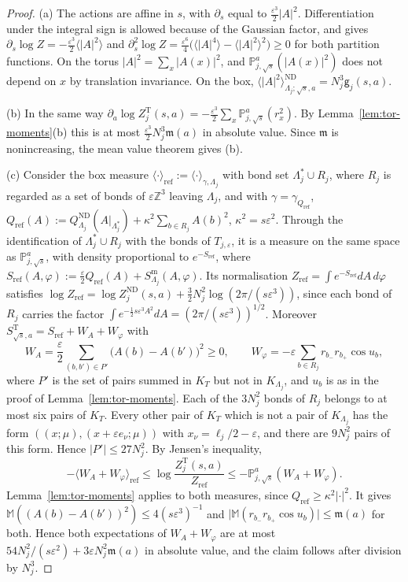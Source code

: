 \documentclass[11pt]{amsart}
\theoremstyle{plain}
\theoremstyle{definition}
\theoremstyle{remark}
\numberwithin{equation}{section}
\newcommand{\Z}{\mathbb{Z}}
\newcommand{\eps}{\varepsilon}
\newcommand{\abs}[1]{\lvert #1\rvert}
\newcommand{\ev}[1]{\langle #1\rangle}
\begin{document}
\begin{proof}
(a) The actions are affine in $s$, with $\partial_s$ equal to $\frac{\eps^3}2\abs A^2$. Differentiation under the integral sign is allowed because of the Gaussian factor, and gives $\partial_s\log Z=-\frac{\eps^3}2\ev{\abs A^2}$ and $\partial_s^2\log Z=\frac{\eps^6}4\big(\ev{\abs A^4}-\ev{\abs A^2}^2\big)\ge0$ for both partition functions. On the torus $\abs A^2=\sum_x\abs{A(x)}^2$, and $\mathbb P^a_{j,\sqrt s}(\abs{A(x)}^2)$ does not depend on $x$ by translation invariance. On the box, $\ev{\abs A^2}^{\mathrm{ND}}_{\Lambda_j;\sqrt s,a}=N_j^3\mathsf g_j(s,a)$.

(b) In the same way $\partial_a\log Z^{\mathrm T}_j(s,a)=-\frac{\eps^3}2\sum_x\mathbb P^a_{j,\sqrt s}(r_x^2)$. By Lemma~\ref{lem:tor-moments}(b) this is at most $\frac{\eps^3}2N_j^3\mathfrak m(a)$ in absolute value. Since $\mathfrak m$ is nonincreasing, the mean value theorem gives (b).

(c) Consider the box measure $\ev\cdot_{\mathrm{ref}}:=\ev\cdot_{\gamma,\Lambda_j}$ with bond set $\Lambda_j^*\cup R_j$, where $R_j$ is regarded as a set of bonds of $\eps\Z^3$ leaving $\Lambda_j$, and with $\gamma=\gamma_{Q_{\mathrm{ref}}}$, $Q_{\mathrm{ref}}(A):=Q^{\mathrm{ND}}_{\Lambda_j}(A|_{\Lambda_j^*})+\kappa^2\sum_{b\in R_j}A(b)^2$, $\kappa^2=s\eps^2$. Through the identification of $\Lambda_j^*\cup R_j$ with the bonds of $T_{j,\eps}$, it is a measure on the same space as $\mathbb P^a_{j,\sqrt s}$, with density proportional to $e^{-S_{\mathrm{ref}}}$, where $S_{\mathrm{ref}}(A,\varphi):=\frac\eps2Q_{\mathrm{ref}}(A)+S^{\mathrm m}_{\Lambda_j}(A,\varphi)$. Its normalisation $Z_{\mathrm{ref}}=\int e^{-S_{\mathrm{ref}}}dA\,d\varphi$ satisfies $\log Z_{\mathrm{ref}}=\log Z^{\mathrm{ND}}_j(s,a)+\frac32N_j^2\log(2\pi/(s\eps^3))$, since each bond of $R_j$ carries the factor $\int e^{-\frac12s\eps^3A^2}dA=(2\pi/(s\eps^3))^{1/2}$. Moreover $S^{\mathrm T}_{\sqrt s,a}=S_{\mathrm{ref}}+W_A+W_\varphi$ with
\[
W_A=\frac\eps2\sum_{(b,b')\in P'}\big(A(b)-A(b')\big)^2\ge0,\qquad W_\varphi=-\eps\sum_{b\in R_j}r_{b_-}r_{b_+}\cos u_b ,
\]
where $P'$ is the set of pairs summed in $K_T$ but not in $K_{\Lambda_j}$, and $u_b$ is as in the proof of Lemma~\ref{lem:tor-moments}. Each of the $3N_j^2$ bonds of $R_j$ belongs to at most six pairs of $K_T$. Every other pair of $K_T$ which is not a pair of $K_{\Lambda_j}$ has the form $((x;\mu),(x+\eps e_\nu;\mu))$ with $x_\nu=\ell_j/2-\eps$, and there are $9N_j^2$ pairs of this form. Hence $\abs{P'}\le27N_j^2$. By Jensen's inequality,
\[
-\ev{W_A+W_\varphi}_{\mathrm{ref}}\le\log\frac{Z^{\mathrm T}_j(s,a)}{Z_{\mathrm{ref}}}\le-\mathbb P^a_{j,\sqrt s}(W_A+W_\varphi).
\]
Lemma~\ref{lem:tor-moments} applies to both measures, since $Q_{\mathrm{ref}}\ge\kappa^2\abs\cdot^2$. It gives $\mathbb M((A(b)-A(b'))^2)\le4(s\eps^3)^{-1}$ and $\abs{\mathbb M(r_{b_-}r_{b_+}\cos u_b)}\le\mathfrak m(a)$ for both. Hence both expectations of $W_A+W_\varphi$ are at most $54N_j^2/(s\eps^2)+3\eps N_j^2\mathfrak m(a)$ in absolute value, and the claim follows after division by $N_j^3$.
\end{proof}
\end{document}
